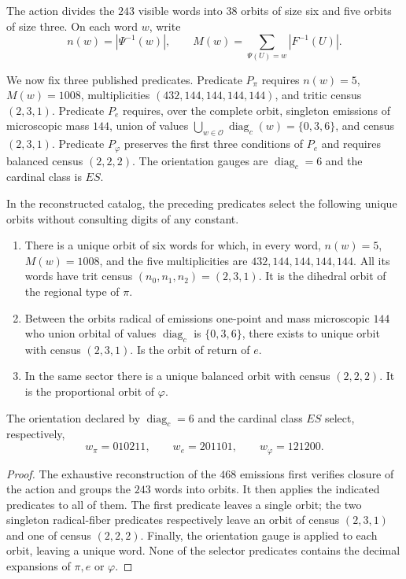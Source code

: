 The action divides the \(243\) visible words into \(38\) orbits of size
six and five orbits of size three. On each word \(w\), write
\[
 n(w)=|\Psi^{-1}(w)|,
 \qquad
 M(w)=\sum_{\Psi(U)=w}|F^{-1}(U)|.
\]

We now fix three published predicates. Predicate \(P_\pi\) requires
\(n(w)=5\), \(M(w)=1008\), multiplicities
\((432,144,144,144,144)\), and tritic census \((2,3,1)\). Predicate
\(P_e\) requires, over the complete orbit, singleton emissions of
microscopic mass \(144\), union of values 
\(\bigcup_{w\in\mathcal O}\operatorname{diag}_c(w)=\{0,3,6\}\), and census
\((2,3,1)\). Predicate \(P_\varphi\) preserves the
first three conditions of \(P_e\) and requires balanced census \((2,2,2)\).
The orientation gauges are \(\operatorname{diag}_c=6\) and the cardinal
class is \(ES\).

\begin{theorem}
\label{thm:selectores-orbitales-constantes}
In the reconstructed catalog, the preceding predicates select the
following unique orbits without consulting digits of any constant.
\begin{enumerate}
  \item There is a unique orbit of six words for which, in every
word, \(n(w)=5\), \(M(w)=1008\), and the five multiplicities are
\(432,144,144,144,144\). All its words have trit census
\((n_0,n_1,n_2)=(2,3,1)\). It is the dihedral orbit of the regional type of
\(\pi\).
  \item Between the orbits radical of emissions one-point and mass
  microscopic \(144\) who union orbital of values
  \(\operatorname{diag}_c\) is \(\{0,3,6\}\), there exists to unique
  orbit with census \((2,3,1)\). Is the orbit of return of \(e\).
  \item In the same sector there is a unique balanced orbit with census
  \((2,2,2)\). It is the proportional orbit of \(\varphi\).
\end{enumerate}
The orientation declared by \(\operatorname{diag}_c=6\) and the cardinal class
\(ES\) select, respectively,
\[
 \boxed{
 w_\pi=010211,
 \qquad
 w_e=201101,
 \qquad
 w_\varphi=121200.
 }
\]
\end{theorem}

\begin{proof}
The exhaustive reconstruction of the \(468\) emissions first verifies
closure of the action and groups the \(243\) words into orbits. It then applies
the indicated predicates to all of them. The first predicate leaves a single
orbit; the two singleton radical-fiber predicates respectively leave an
orbit of census \((2,3,1)\) and one of census \((2,2,2)\). Finally, the
orientation gauge is applied to each orbit, leaving a unique word.
None of the selector predicates contains the decimal expansions of
\(\pi,e\) or \(\varphi\).
\end{proof}

